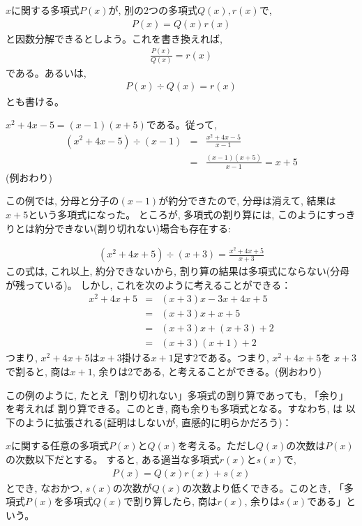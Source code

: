 $x$に関する多項式$P(x)$が, 別の2つの多項式$Q(x), r(x)$で, 
\begin{eqnarray}P(x)=Q(x)r(x)\label{eq:poly_div0}\end{eqnarray}
と因数分解できるとしよう。これを書き換えれば, 
\begin{eqnarray}\frac{P(x)}{Q(x)}=r(x)\end{eqnarray}
である。あるいは, 
\begin{eqnarray}P(x)\div Q(x)=r(x)\end{eqnarray}
とも書ける。

\begin{exmpl}  $x^2+4x-5=(x-1)(x+5)$である。従って, 
\begin{eqnarray*}
(x^2+4x-5)\div(x-1)&=&\frac{x^2+4x-5}{x-1}\\
&=&\frac{(x-1)(x+5)}{x-1}=x+5
\end{eqnarray*}
(例おわり)\end{exmpl}
\hv

この例では, 分母と分子の$(x-1)$が約分できたので, 分母は消えて, 結果は$x+5$という多項式になった。
ところが, 多項式の割り算には, このようにすっきりとは約分できない(割り切れない)場合も存在する:
\hv

\begin{exmpl}  
\begin{eqnarray}
(x^2+4x+5)\div(x+3)=\frac{x^2+4x+5}{x+3}
\end{eqnarray}
この式は, これ以上, 約分できないから, 割り算の結果は多項式にならない(分母が残っている)。
しかし, これを次のように考えることができる：
\begin{eqnarray*}
x^2+4x+5&=&(x+3)x-3x+4x+5\\
        &=&(x+3)x+x+5\\
       &=&(x+3)x+(x+3)+2\\
       &=&(x+3)(x+1)+2
\end{eqnarray*}
つまり, $x^2+4x+5$は$x+3$掛ける$x+1$足す2である。つまり, $x^2+4x+5$を
$x+3$で割ると, 商は$x+1$, 余りは2である, と考えることができる。(例おわり)\end{exmpl}
\hv

この例のように, たとえ「割り切れない」多項式の割り算であっても, 「余り」を考えれば
割り算できる。このとき, 商も余りも多項式となる。すなわち, は
以下のように拡張される(証明はしないが, 直感的に明らかだろう)：

$x$に関する任意の多項式$P(x)$と$Q(x)$を考える。ただし$Q(x)$の次数は$P(x)$の次数以下だとする。
すると, ある適当な多項式$r(x)$と$s(x)$で, 
\begin{eqnarray}
P(x)=Q(x)r(x)+s(x)\label{eq:poly_div1}
\end{eqnarray}
とでき, なおかつ, $s(x)$の次数が$Q(x)$の次数より低くできる。このとき, 
「多項式$P(x)$を多項式$Q(x)$で割り算したら, 商は$r(x)$, 余りは$s(x)$である」という。

